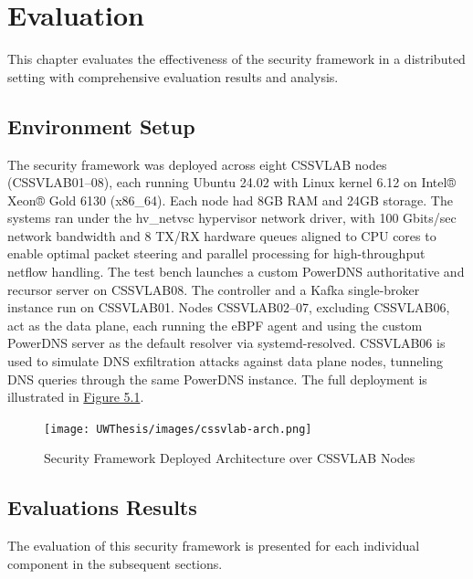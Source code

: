 \documentclass [11pt, proquest] {uwthesis}[2020/02/24]
\begin{document}





\chapter{Evaluation}
This chapter evaluates the effectiveness of the security framework in a distributed setting with  comprehensive evaluation results and analysis.


\section{Environment Setup}
The security framework was deployed across eight CSSVLAB nodes (CSSVLAB{01–08}), each running Ubuntu 24.02 with Linux kernel 6.12 on Intel® Xeon® Gold 6130 (x86\_64). Each node had 8GB RAM and 24GB storage. The systems ran under the hv\_netvsc hypervisor network driver, with 100 Gbits/sec network bandwidth and 8 TX/RX hardware queues aligned to CPU cores to enable optimal packet steering and parallel processing for high-throughput netflow handling. The test bench launches a custom PowerDNS authoritative and recursor server on CSSVLAB08. The controller and a Kafka single-broker instance run on CSSVLAB01. Nodes CSSVLAB{02–07}, excluding CSSVLAB06, act as the data plane, each running the eBPF agent and using the custom PowerDNS server as the default resolver via systemd-resolved. CSSVLAB06 is used to simulate DNS exfiltration attacks against data plane nodes, tunneling DNS queries through the same PowerDNS instance. The full deployment is illustrated in \hyperref[sec:deployed-arch]{Figure 5.1}.


\begin{figure}[h]
\centering
\texttt{[image: UWThesis/images/cssvlab-arch.png]}
\caption{Security Framework Deployed Architecture over CSSVLAB Nodes}
\label{sec:deployed-arch}
\end{figure}


\section{Evaluations Results}
The evaluation of this security framework is presented for each individual component in the subsequent sections.
\end{document}
